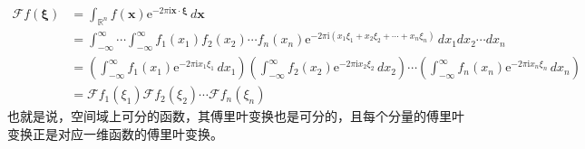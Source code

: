 \documentclass{ctexbook}
\begin{document}
{\color{blue}
\begin{align*}
\mathcal{F} f(\boldsymbol{\xi})&=\int_{\mathbb{R}^n}f(\mathbf{x})\mathrm{e}^{-2\pi \mathrm{i} \mathbf{x}\cdot\boldsymbol{\xi}}\,d\mathbf{x}\\
&=\int_{-\infty}^{\infty}\cdots \int_{-\infty}^{\infty}f_1(x_1)f_2(x_2)\cdots f_n(x_n)\mathrm{e}^{-2\pi \mathrm{i} (x_1\xi_1+x_2\xi_2+\cdots +x_n\xi_n)}\,dx_1 dx_2\cdots dx_n\\
&=\left(\int_{-\infty}^{\infty}f_1(x_1)\mathrm{e}^{-2\pi \mathrm{i} x_1\xi_1}\,dx_1\right)\left(\int_{-\infty}^{\infty}f_2(x_2)\mathrm{e}^{-2\pi \mathrm{i} x_2\xi_2}\,dx_2\right)\cdots \left(\int_{-\infty}^{\infty}f_n(x_n)\mathrm{e}^{-2\pi \mathrm{i} x_n\xi_n}\,dx_n\right)\\
&=\mathcal{F} f_1(\xi_1)\mathcal{F} f_2(\xi_2)\cdots \mathcal{F} f_n(\xi_n)
\end{align*}}
也就是说，空间域上可分的函数，其傅里叶变换也是可分的，且每个分量的傅里叶变换正是对应一维函数的傅里叶变换。
\end{document}
